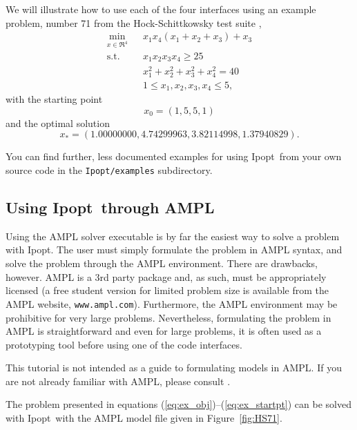 \documentclass[10pt]{article}
\newcommand{\Ipopt}{{\sc Ipopt}}
\begin{document}
We will illustrate how to use each of the four interfaces using an
example problem, number 71 from the Hock-Schittkowsky test suite \cite{HS},
  \begin{eqnarray}
    \min_{x \in \Re^4} &&x_1 x_4 (x_1 + x_2 + x_3)  +  x_3 \label{eq:ex_obj} \\
    \mbox{s.t.}  &&x_1 x_2 x_3 x_4 \ge 25 \label{eq:ex_ineq} \\
    &&x_1^2 + x_2^2 + x_3^2 + x_4^2  =  40 \label{eq:ex_equ} \\
    &&1 \leq x_1, x_2, x_3, x_4 \leq 5, \label{eq:ex_bounds}
  \end{eqnarray}
with the starting point
\begin{equation}
x_0 = (1, 5, 5, 1) \label{eq:ex_startpt}
\end{equation}
and the optimal solution
\[
x_* = (1.00000000, 4.74299963, 3.82114998, 1.37940829). \nonumber
\]

You can find further, less documented examples for using \Ipopt\ from
your own source code in the {\tt Ipopt/examples} subdirectory.

\subsection{Using \Ipopt\ through AMPL}
Using the AMPL solver executable is by far the easiest way to
solve a problem with \Ipopt. The user must simply formulate the problem
in AMPL syntax, and solve the problem through the AMPL environment.
There are drawbacks, however. AMPL is a 3rd party package and, as
such, must be appropriately licensed (a free student version for
limited problem size is available from the AMPL website,
\texttt{www.ampl.com}). Furthermore, the AMPL environment may be prohibitive
for very large problems. Nevertheless, formulating the problem in AMPL
is straightforward and even for large problems, it is often used as a
prototyping tool before using one of the code interfaces.

This tutorial is not intended as a guide to formulating models in
AMPL. If you are not already familiar with AMPL, please consult
\cite{FouGayKer:AMPLbook}.

The problem presented in equations
(\ref{eq:ex_obj})--(\ref{eq:ex_startpt}) can be solved with \Ipopt\ with
the AMPL model file given in Figure~\ref{fig:HS71}.
\end{document}
